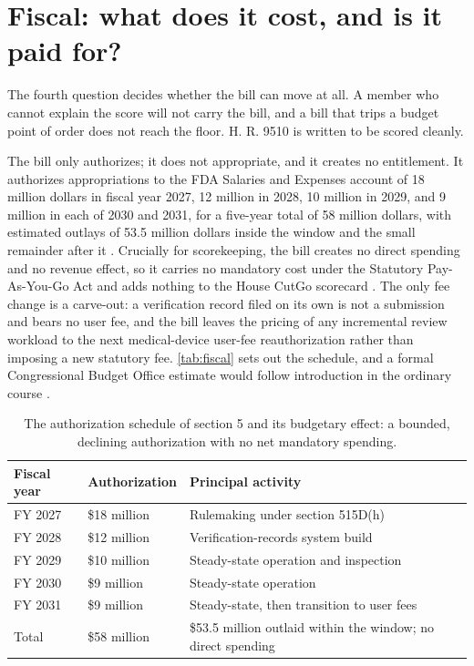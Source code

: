 \section{Fiscal: what does it cost, and is it paid for?}
\label{sec:fiscal}

The fourth question decides whether the bill can move at all. A member who cannot
explain the score will not carry the bill, and a bill that trips a budget point of
order does not reach the floor. H. R. 9510 is written to be scored cleanly.

The bill only authorizes; it does not appropriate, and it creates no entitlement. It
authorizes appropriations to the FDA Salaries and Expenses account of 18 million
dollars in fiscal year 2027, 12 million in 2028, 10 million in 2029, and 9 million in
each of 2030 and 2031, for a five-year total of 58 million dollars, with estimated
outlays of 53.5 million dollars inside the window and the small remainder after it
\cite{Kawchak2026HR9510Bill}. Crucially for scorekeeping, the bill creates no direct
spending and no revenue effect, so it carries no mandatory cost under the Statutory
Pay-As-You-Go Act and adds nothing to the House CutGo scorecard
\cite{paygo2010, houserules2025}. The only fee change is a carve-out: a verification
record filed on its own is not a submission and bears no user fee, and the bill
leaves the pricing of any incremental review workload to the next medical-device
user-fee reauthorization rather than imposing a new statutory fee. \autoref{tab:fiscal}
sets out the schedule, and a formal Congressional Budget Office estimate would follow
introduction in the ordinary course \cite{cbo2024costestimates}.

\begin{table}[H]
\footnotesize
\begin{tabularx}{\textwidth}{@{}L{1.6cm} C{6cm} Y@{}}
\toprule
\textbf{Fiscal year} & \textbf{Authorization} & \textbf{Principal activity}\\
\midrule
FY 2027 & \$18 million & Rulemaking under section 515D(h)\\
FY 2028 & \$12 million & Verification-records system build\\
FY 2029 & \$10 million & Steady-state operation and inspection\\
FY 2030 & \$9 million & Steady-state operation\\
FY 2031 & \$9 million & Steady-state, then transition to user fees\\
\midrule
Total & \$58 million & \$53.5 million outlaid within the window; no direct spending\\
\bottomrule
\end{tabularx}
\caption{The authorization schedule of section 5 and its budgetary effect: a bounded,
declining authorization with no net mandatory spending.}
\label{tab:fiscal}
\end{table}

